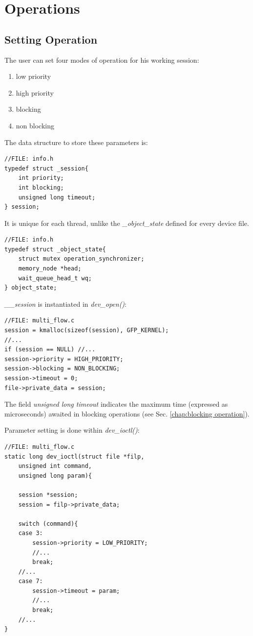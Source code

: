 \documentclass[12pt]{report}
\begin{document}
\chapter{Operations}
\section{Setting Operation}

The user can set four modes of operation for his working session: 

\begin{enumerate}
	\itemsep0em 
	\item low priority
	\item high priority
	\item blocking
	\item non blocking
\end{enumerate}

The data structure to store these parameters is:

\begin{lstlisting}
//FILE: info.h
typedef struct _session{
	int priority;       
	int blocking;
	unsigned long timeout;
} session;
\end{lstlisting}

It is unique for each thread, unlike the \emph{\_object\_state} defined for every device file.

\begin{lstlisting}
//FILE: info.h
typedef struct _object_state{
	struct mutex operation_synchronizer;
	memory_node *head;
	wait_queue_head_t wq;
} object_state;
\end{lstlisting}

\emph{\_\_session} is instantiated in \emph{dev\_open()}:

\begin{lstlisting}
//FILE: multi_flow.c
session = kmalloc(sizeof(session), GFP_KERNEL);
//...
if (session == NULL) //...
session->priority = HIGH_PRIORITY;
session->blocking = NON_BLOCKING;
session->timeout = 0;
file->private_data = session;
\end{lstlisting}

The field \emph{unsigned long timeout} indicates the maximum time (expressed as microseconds) awaited in blocking operations (see Sec. \ref{chap:blocking operation}). 

Parameter setting is done within \emph{dev\_ioctl()}:

\begin{lstlisting}
//FILE: multi_flow.c
static long dev_ioctl(struct file *filp, 
	unsigned int command, 
	unsigned long param){

	session *session;
	session = filp->private_data;
	
	switch (command){
	case 3:
		session->priority = LOW_PRIORITY;
		//...
		break;
	//...
	case 7:
		session->timeout = param;
		//...
		break;
	//...
}
\end{lstlisting}
\end{document}
